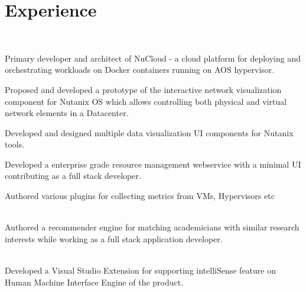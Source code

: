 \documentclass[]{deedy-resume-openfont}
\begin{document}
    \begin{minipage}[t]{0.66\textwidth} 
    
    
    \section{Experience}
    
    \\
    \vspace{\topsep} %
    \begin{tightemize}
    \item Primary developer and architect of NuCloud - a cloud platform for deploying and orchestrating workloads on Docker containers running on AOS hypervisor.
    \item Proposed and developed a prototype of the interactive network visualization component for Nutanix OS which allows controlling both physical and virtual network elements in a Datacenter. 
    \item Developed and designed multiple data visualization UI components for Nutanix tools.
    \end{tightemize}
    \begin{tightemize}
    \item Developed a enterprise grade resource management webservice with a minimal UI contributing as a full stack developer.
    \item Authored various plugins for collecting metrics from VMs, Hypervisors etc
    \end{tightemize}
    \sectionsep
    
    \\
    Authored a recommender engine for matching academicians with similar research interests while working as a full stack application developer.
    \sectionsep
    
    \\
    Developed a Visual Studio Extension for supporting intelliSense feature on Human Machine Interface Engine of the product.
    \sectionsep
    

\end{minipage}
\end{document}
